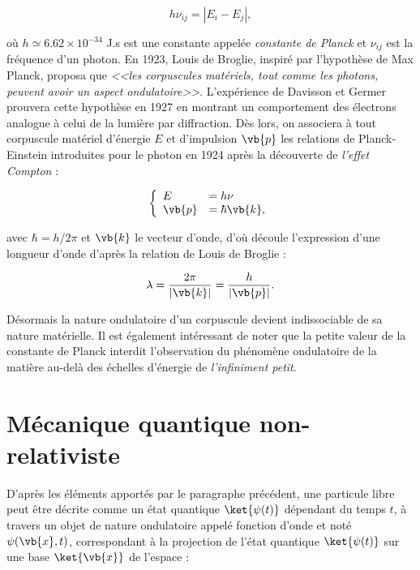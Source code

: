             \begin{equation}
                h\nu_{ij}=|E_i-E_j|,
            \end{equation}
            
        où $h\simeq6.62\times10^{-34}$ J.s est une constante appelée \textit{constante de Planck} et $\nu_{ij}$ est la fréquence d'un photon. En 1923, Louis de Broglie, inspiré par l'hypothèse de Max Planck, proposa  que \textit{<<les corpuscules matériels, tout comme les photons, peuvent avoir un aspect ondulatoire>>}. L'expérience de Davisson et Germer \cite{Germer1927} prouvera cette hypothèse en 1927 en montrant un comportement des électrons analogue à celui de la lumière par diffraction. Dès lors, on associera à tout corpuscule matériel d'énergie $E$ et d'impulsion $\vb{p}$ les relations de Planck-Einstein introduites pour le photon en 1924 après la découverte de \textit{l'effet Compton} \cite{Compton1923} :
            
            \begin{equation}
                \left\{
                    \begin{array}{ll}
                        E & = h\nu \\
                        \vb{p} & = \hbar\vb{k},
                    \end{array}
                \right.
            \end{equation}

            avec $\hbar=h/2\pi$ et $\vb{k}$ le vecteur d'onde, d'où découle l'expression d'une longueur d'onde d'après la relation de Louis de Broglie :
            
            \begin{equation}
                \lambda=\frac{2\pi}{|\vb{k}|}=\frac{h}{|\vb{p}|}.
            \end{equation}
            
        Désormais la nature ondulatoire d'un corpuscule devient indissociable de sa nature matérielle. Il est également intéressant de noter que la petite valeur de la constante de Planck interdit l'observation du phénomène ondulatoire de la matière au-delà des échelles d'énergie de \textit{l'infiniment petit}.
        
        \section{Mécanique quantique non-relativiste}
        
         D'après les éléments apportés par le paragraphe précédent, une particule libre peut être décrite comme un état quantique $\ket{\psi(t)}$ dépendant du temps $t$, à travers un objet de nature ondulatoire appelé fonction d'onde et noté $\psi(\vb{x},t)$, correspondant à la projection de l'état quantique $\ket{\psi(t)}$ sur une base $\ket{\vb{x}}$ de l'espace :
        
